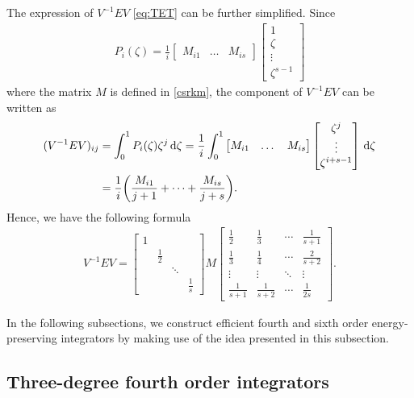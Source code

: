 \documentclass[final,leqno,onefignum,onetabnum]{siamltex1213}
\DeclarePairedDelimiter\paren{\lparen}{\rparen}
\begin{document}
The expression of $V^{-1}EV$ \eqref{eq:TET} can be
further simplified.
Since 
\begin{align*}
P_i(\zeta) = \frac{1}{i} 
\begin{bmatrix}
M_{i1} & \dots & M_{is}
\end{bmatrix}
\begin{bmatrix}
1 \\ \zeta \\ \vdots \\ \zeta ^{s-1}
\end{bmatrix}
\end{align*}
where the matrix $M$ is defined in \eqref{csrkm}, 
the component of $V^{-1}EV$ can be written as
\begin{align*}
(V^{-1}EV)_{ij} &= \int_0^1 P_i(\zeta)\zeta^j \,{\mathrm d}\zeta
=
\frac{1}{i}\int_0^1 
\begin{bmatrix}
M_{i1} & \dots & M_{is}
\end{bmatrix}
\begin{bmatrix}
\zeta^j \\  \vdots \\ \zeta ^{i+s-1}
\end{bmatrix}\,{\mathrm d}\zeta \\
&=
\frac{1}{i}
\paren*{\frac{M_{i1}}{j+1} + \dots + \frac{M_{is}}{j+s}}.
\end{align*}
Hence, we have the following formula
\begin{align}
V^{-1}EV = 
\begin{bmatrix}
1 & & & \\ & \frac{1}{2} & & \\ & & \ddots & \\ & & & \frac{1}{s}
\end{bmatrix}
M
\begin{bmatrix}
\frac{1}{2} & \frac{1}{3} & \cdots & \frac{1}{s+1} \\ 
\frac{1}{3} & \frac{1}{4} & \cdots  & \frac{2}{s+2} \\ 
\vdots & \vdots & \ddots & \vdots \\
\frac{1}{s+1}& \frac{1}{s+2} & \cdots & \frac{1}{2s}
\end{bmatrix}.
\label{VEV}
\end{align}

In the following subsections, we construct efficient fourth and sixth order
energy-preserving integrators 
by making use of the idea presented in this subsection.

\subsection{Three-degree fourth order integrators}
\end{document}
